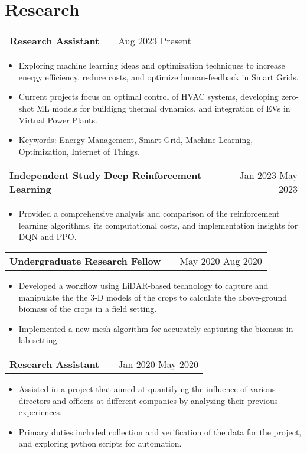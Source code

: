 \documentclass[a4paper,12pt]{article}
\makeatletter
\newenvironment{joblong}[2]
    {
    \begin{tabularx}{\linewidth}{@{}l X r@{}}
    \textbf{#1} & \hfill &  #2 \\[3.75pt]
    \end{tabularx}
    \begin{minipage}[t]{\linewidth}
    \begin{itemize}[nosep,after=\strut, leftmargin=1em, itemsep=3pt,label=--]
    }
    {
    \end{itemize}
    \end{minipage}    
    }
\makeatother
\begin{document}
\section{Research}

\begin{joblong}{Research Assistant}{Aug 2023 Present} %
\item Exploring machine learning ideas and optimization techniques to increase energy efficiency, reduce costs, and optimize human-feedback in Smart Grids. %
\item Current projects focus on optimal control of HVAC systems, developing zero-shot ML models for buildigng thermal dynamics, and integration of EVs in Virtual Power Plants. %
\item Keywords: Energy Management, Smart Grid, Machine Learning, Optimization, Internet of Things. %
\end{joblong}

\begin{joblong}{Independent Study Deep Reinforcement Learning}{Jan 2023 May 2023} %
\item Provided a comprehensive analysis and comparison of the reinforcement learning algorithms, its computational costs, and implementation insights for DQN and PPO. %
\end{joblong}

\begin{joblong}{Undergraduate Research Fellow}{May 2020 Aug 2020} %
\item Developed a workflow using LiDAR-based technology to capture and manipulate the the 3-D models of the crops to calculate the above-ground biomass of the crops in a field setting. %
\item Implemented a new mesh algorithm for accurately capturing the biomass in lab setting. %
\end{joblong}
  
\begin{joblong}{Research Assistant}{Jan 2020 May 2020} %
\item Assisted in a project that aimed at quantifying the influence of various directors and officers at different companies by analyzing their previous experiences. %
\item Primary duties included collection and verification of the data for the project, and exploring python scripts for automation. %
\end{joblong}
\end{document}
